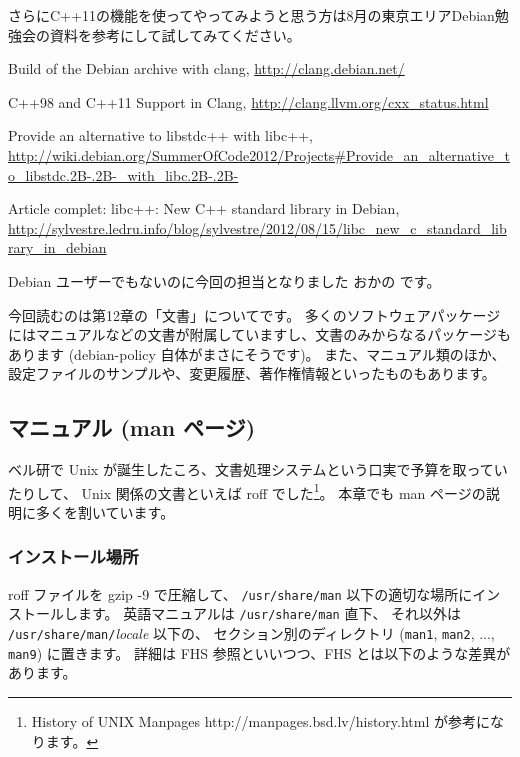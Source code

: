 \documentclass[mingoth,a4paper]{jsarticle}
\begin{document}
さらにC++11の機能を使ってやってみようと思う方は8月の東京エリアDebian勉強会の資料を参考にして試してみてください。

\begin{thebibliography}{9}

Build of the Debian archive with clang, \url{http://clang.debian.net/}

C++98 and C++11 Support in Clang, \url{http://clang.llvm.org/cxx_status.html}

Provide an alternative to libstdc++ with libc++, \url{http://wiki.debian.org/SummerOfCode2012/Projects\#Provide_an_alternative_to_libstdc.2B-.2B-_with_libc.2B-.2B-}

Article complet: libc++: New C++ standard library in Debian, \url{http://sylvestre.ledru.info/blog/sylvestre/2012/08/15/libc_new_c_standard_library_in_debian}

\end{thebibliography}

\clearpage


Debian ユーザーでもないのに今回の担当となりました おかの です。

今回読むのは第12章の「文書」についてです。
多くのソフトウェアパッケージにはマニュアルなどの文書が附属していますし、文書のみからなるパッケージもあります (debian-policy 自体がまさにそうです)。
また、マニュアル類のほか、設定ファイルのサンプルや、変更履歴、著作権情報といったものもあります。

\subsection{マニュアル (man ページ)}
ベル研で Unix が誕生したころ、文書処理システムという口実で予算を取っていたりして、
Unix 関係の文書といえば roff でした\footnote{History of UNIX Manpages http://manpages.bsd.lv/history.html が参考になります。}。
本章でも man ページの説明に多くを割いています。

\subsubsection{インストール場所}
roff ファイルを gzip -9 で圧縮して、
{\tt /usr/share/man} 以下の適切な場所にインストールします。
英語マニュアルは {\tt /usr/share/man} 直下、
それ以外は {\tt /usr/share/man/}{\it locale} 以下の、
セクション別のディレクトリ ({\tt man1}, {\tt man2}, ..., {\tt man9}) に置きます。
詳細は FHS 参照といいつつ、FHS とは以下のような差異があります。
\end{document}
